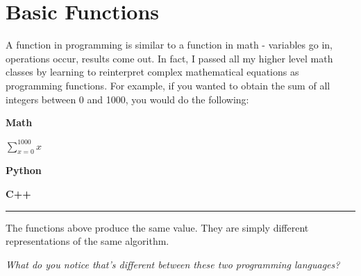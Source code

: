\section{Basic Functions}
A function in programming is similar to a function in math - variables
go in, operations occur, results come out. In fact, I passed all my
higher level math classes by learning to reinterpret
complex mathematical equations as programming functions. For example, if
you wanted to obtain the sum of all integers between 0 and 1000, you
would do the following:

\textbf{Math}

\(\sum\limits_{x=0}^{1000}x\)

\textbf{Python}

\begin{Shaded}
\begin{Highlighting}[]
\OperatorTok{=} 
 \NormalTok{(}\NormalTok{,}\NormalTok{):}
\OperatorTok{+=}
\end{Highlighting}
\end{Shaded}

\textbf{C++}

\begin{Shaded}
\begin{Highlighting}[]
\OperatorTok{=} \OperatorTok{;}
\OperatorTok{(}\OperatorTok{=}\OperatorTok{;}\OperatorTok{\textless{}=}\OperatorTok{;}\OperatorTok{++)}
\OperatorTok{\{}
\OperatorTok{+=}\OperatorTok{;}
\OperatorTok{\}}
\OperatorTok{\textless{}\textless{}}\OperatorTok{\textless{}\textless{}}\OperatorTok{;}
\end{Highlighting}
\end{Shaded}

\begin{center}\rule{0.5\linewidth}{0.5pt}\end{center}

The functions above produce the same value. They are simply different
representations of the same algorithm.

\emph{What do you notice that's different between these two programming
languages?}

